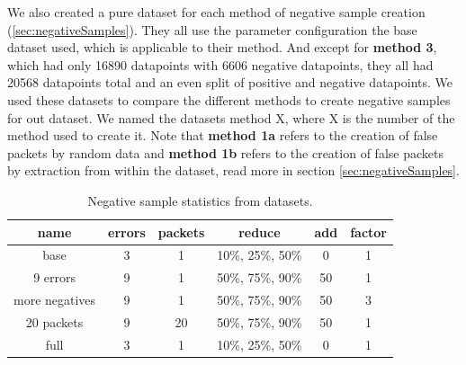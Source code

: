\documentclass[
	ngerman,
	ruledheaders=section,%
	class=report,%
	thesis={type=bachelor},%
	accentcolor=9c,%
	custommargins=true,%
	marginpar=false,%
	parskip=half-,%
	fontsize=11pt,%
]{tudapub}
\begin{document}
We also created a pure dataset for each method of negative sample creation (\ref{sec:negativeSamples}).
They all use the parameter configuration the base dataset used, which is applicable to their method.
And except for \textbf{method 3}, which had only 16890 datapoints with 6606 negative datapoints, they all had 20568 datapoints total and an even split of positive and negative datapoints.
We used these datasets to compare the different methods to create negative samples for out dataset.
We named the datasets method X, where X is the number of the method used to create it.
Note that \textbf{method 1a} refers to the creation of false packets by random data and \textbf{method 1b} refers to the creation of false packets by extraction from within the dataset, read more in section \ref{sec:negativeSamples}.







\begin{table}
    \centering
    \begin{tabular}{|c|c|c|c|c|c|}
        \hline
        \textbf{name} & \textbf{errors} & \textbf{packets} & \textbf{reduce} & \textbf{add} & \textbf{factor} \\
        \hline
        base & 3 & 1 & 10\%, 25\%, 50\% & 0 & 1 \\
        \hline
        9 errors & 9 & 1 & 50\%, 75\%, 90\% & 50 & 1 \\
        \hline
        more negatives & 9 & 1 & 50\%, 75\%, 90\% & 50 & 3 \\
        \hline
        20 packets & 9 & 20 & 50\%, 75\%, 90\% & 50 & 1 \\
        \hline
        full & 3 & 1 & 10\%, 25\%, 50\% & 0 & 1 \\
        \hline
    \end{tabular}
    \caption{Negative sample statistics from datasets.}
    \label{tab:negativeSamples}
\end{table}
\end{document}
